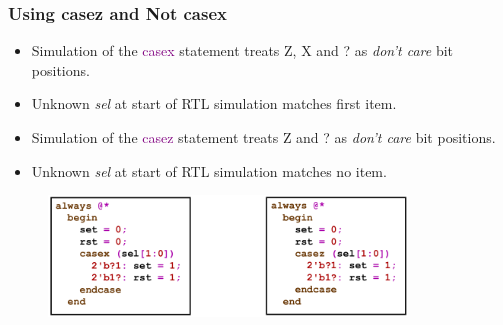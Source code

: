 \documentclass[t, notes, xcolor=table]{beamer}
\begin{document}
\begin{frame}
\frametitle{Using casez and Not casex}
\scriptsize{
\begin{multicols}{2}
\begin{itemize}
\item Simulation of the \textcolor{purple}{casex} statement treats Z, X and ? as \textit{don't care} bit positions.
\item Unknown \textit{sel} at start of RTL simulation matches first item.
\end{itemize}
\vfill
\columnbreak
\begin{itemize}
\item Simulation of the \textcolor{purple}{casez} statement treats Z and ? as \textit{don't care} bit positions.
\item Unknown \textit{sel} at start of RTL simulation matches no item.
\end{itemize}

\end{multicols}
}
\begin{figure}
    \includegraphics[width=0.85\textwidth]{img/15_casez_casex.png}
\end{figure}
\end{frame}
\end{document}
